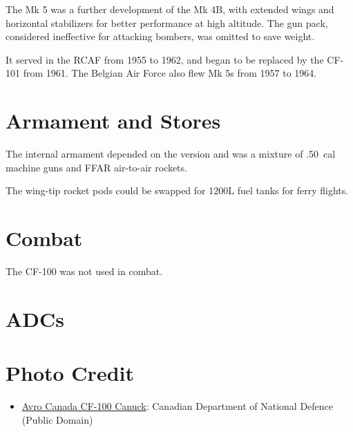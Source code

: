 The Mk 5 was a further development of the Mk 4B, with extended wings and horizontal stabilizers for better performance at high altitude. The gun pack, considered ineffective for attacking bombers, was omitted to save weight.

It served in the RCAF from 1955 to 1962, and began to be replaced by the CF-101 from 1961. The Belgian Air Force also flew Mk 5s from 1957 to 1964.

\section{Armament and Stores}

The internal armament depended on the version and was a mixture of .50~cal machine guns and FFAR air-to-air rockets.

The wing-tip rocket pods could be swapped for 1200L fuel tanks for ferry flights.

\section{Combat}

The CF-100 was not used in combat.

\section{ADCs}
\begin{adclist}
\end{adclist}

\section{Photo Credit}
\begin{itemize}\raggedright
    \item \href{https://commons.wikimedia.org/wiki/File:CF-100s_423_Sqn.jpg}{Avro Canada CF-100 Canuck}: Canadian Department of National Defence (Public Domain)
\end{itemize}
